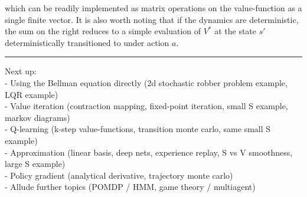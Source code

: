 which can be readily implemented as matrix operations on the value-function as a single finite vector. It is also worth noting that if the dynamics are deterministic, the sum on the right reduces to a simple evaluation of $V^*$ at the state $s'$ deterministically transitioned to under action $a$.

\vspace{5ex}\hrule\vspace{2ex}

Next up:\\
- Using the Bellman equation directly (2d stochastic robber problem example, LQR example)\\
- Value iteration (contraction mapping, fixed-point iteration, small S example, markov diagrams)\\
- Q-learning (k-step value-functions, transition monte carlo, same small S example)\\
- Approximation (linear basis, deep nets, experience replay, S vs V smoothness, large S example)\\
- Policy gradient (analytical derivative, trajectory monte carlo)\\
- Allude further topics (POMDP / HMM, game theory / multiagent)



